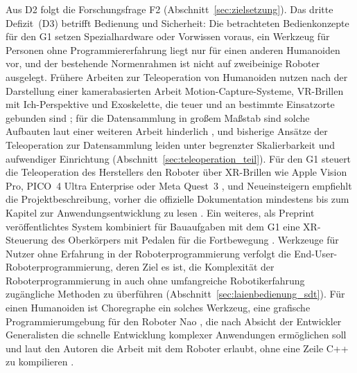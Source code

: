 Aus D2 folgt die Forschungsfrage F2 (Abschnitt~\ref{sec:zielsetzung}).
%
Das dritte Defizit~(D3) betrifft Bedienung und Sicherheit: Die betrachteten Bedienkonzepte für den G1 setzen Spezialhardware oder Vorwissen voraus, ein Werkzeug für Personen ohne Programmiererfahrung liegt nur für einen anderen Humanoiden vor, und der bestehende Normenrahmen ist nicht auf zweibeinige Roboter ausgelegt.
Frühere Arbeiten zur Teleoperation von Humanoiden nutzen nach der Darstellung einer kamerabasierten Arbeit Motion-Capture-Systeme, VR-Brillen mit Ich-Perspektive und Exoskelette, die teuer und an bestimmte Einsatzorte gebunden sind \cite{Fu2024}; für die Datensammlung in großem Maßstab sind solche Aufbauten laut einer weiteren Arbeit hinderlich \cite{He2024}, und bisherige Ansätze der Teleoperation zur Datensammlung leiden unter begrenzter Skalierbarkeit und aufwendiger Einrichtung \cite{Zhao2025} (Abschnitt~\ref{sec:teleoperation_teil}).
Für den G1 steuert die Teleoperation des Herstellers den Roboter über XR-Brillen wie Apple Vision Pro, PICO~4 Ultra Enterprise oder Meta Quest~3 \cite{UnitreeXRTeleop}, und Neueinsteigern empfiehlt die Projektbeschreibung, vorher die offizielle Dokumentation mindestens bis zum Kapitel zur Anwendungsentwicklung zu lesen \cite{UnitreeXRTeleop}.
Ein weiteres, als Preprint veröffentlichtes System kombiniert für Bauaufgaben mit dem G1 eine XR-Steuerung des Oberkörpers mit Pedalen für die Fortbewegung \cite{AliPour2026}.
Werkzeuge für Nutzer ohne Erfahrung in der Roboterprogrammierung verfolgt die End-User-Roboterprogrammierung, deren Ziel es ist, die Komplexität der Roboterprogrammierung in auch ohne umfangreiche Robotikerfahrung zugängliche Methoden zu überführen \cite{Ajaykumar2021} (Abschnitt~\ref{sec:laienbedienung_sdt}).
Für einen Humanoiden ist Choregraphe ein solches Werkzeug, eine grafische Programmierumgebung für den Roboter Nao \cite{Pot2009}, die nach Absicht der Entwickler Generalisten die schnelle Entwicklung komplexer Anwendungen ermöglichen soll \cite{Pot2009} und laut den Autoren die Arbeit mit dem Roboter erlaubt, ohne eine Zeile C++ zu kompilieren \cite{Pot2009}.
